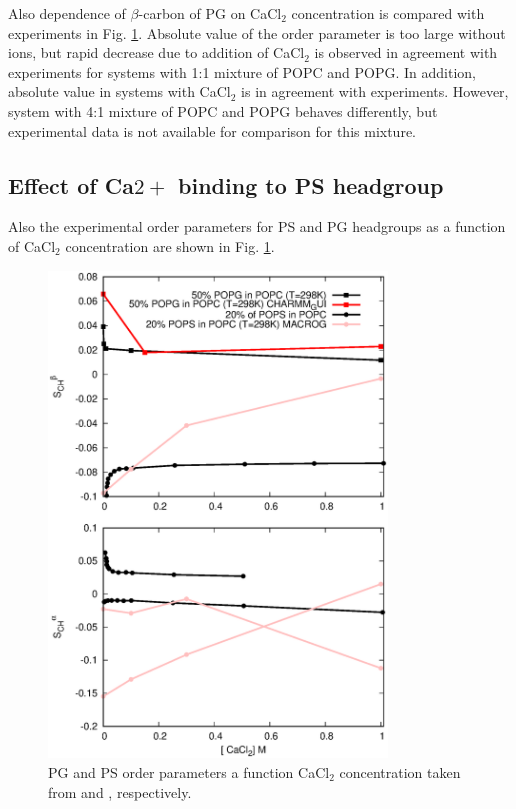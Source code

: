 \documentclass[aps,prl,superscriptaddress,twocolumn]{revtex4}
\begin{document}
Also dependence of $\beta$-carbon of PG on CaCl$_2$ concentration is compared with
experiments \cite{borle85} in Fig. \ref{PSPGchangesWITHCaCl}. Absolute value of
the order parameter is too large without ions, but rapid decrease due to addition of
CaCl$_2$ is observed in agreement with experiments for systems with 1:1 mixture of POPC and POPG.
In addition, absolute value in systems with CaCl$_2$ is in agreement with experiments.
However, system with 4:1 mixture of POPC and POPG behaves differently, but experimental
data is not available for comparison for this mixture.


\subsection{Effect of Ca$2+$ binding to PS headgroup}

Also the experimental order parameters for PS and PG headgroups
as a function of CaCl$_2$ concentration are shown in Fig. \ref{PSPGchangesWITHCaCl}.
\begin{figure}[]
  \centering
  \includegraphics[width=9.0cm]{../Figs/PSPGwithCaCl.eps}
  \caption{\label{PSPGchangesWITHCaCl}
    PG and PS order parameters a function CaCl$_2$ concentration taken from \cite{borle85} and \cite{roux90}, respectively.
  }
\end{figure}
\end{document}
